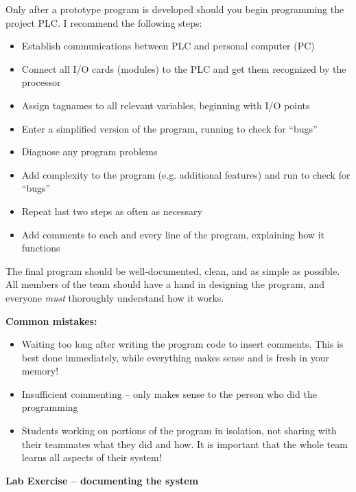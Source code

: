 \vskip 10pt

Only after a prototype program is developed should you begin programming the project PLC.  I recommend the following steps:

\begin{itemize}
\item{} Establish communications between PLC and personal computer (PC)
\item{} Connect all I/O cards (modules) to the PLC and get them recognized by the processor
\item{} Assign tagnames to all relevant variables, beginning with I/O points
\item{} Enter a simplified version of the program, running to check for ``bugs''
\item{} Diagnose any program problems
\item{} Add complexity to the program (e.g. additional features) and run to check for ``bugs''
\item{} Repeat last two steps as often as necessary
\item{} Add comments to each and every line of the program, explaining how it functions
\end{itemize}

The final program should be well-documented, clean, and as simple as possible.  All members of the team should have a hand in designing the program, and everyone {\it must} thoroughly understand how it works.

\vskip 10pt

{\bf Common mistakes:}

\begin{itemize}
\item{} Waiting too long after writing the program code to insert comments.  This is best done immediately, while everything makes sense and is fresh in your memory!
\item{} Insufficient commenting -- only makes sense to the person who did the programming
\item{} Students working on portions of the program in isolation, not sharing with their teammates what they did and how.  It is important that the whole team learns all aspects of their system!
\end{itemize}








\vfil \eject

\noindent
{\bf Lab Exercise -- documenting the system}

